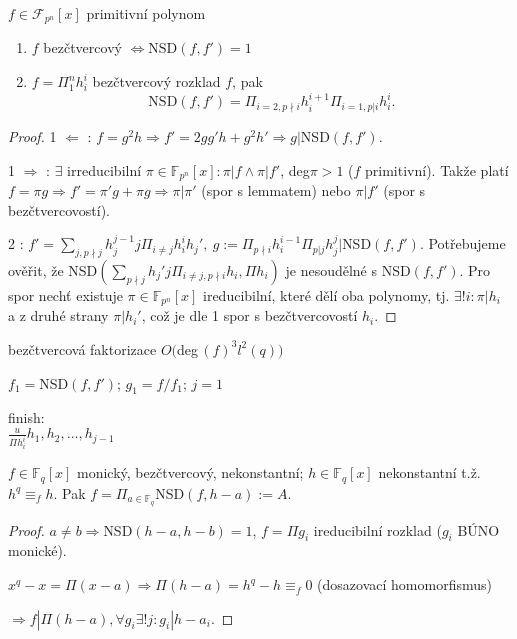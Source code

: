 \begin{thm}
    $f \in \mathcal{F}_{p^n}[x]$ primitivní polynom
    \begin{enumerate}
        \item $f$ bezčtvercový $\Leftrightarrow \text{NSD}(f,f')=1$
        \item $f=\Pi_1^nh_i^i$ bezčtvercový rozklad $f$, pak 
        \[
            \text{NSD}(f,f')=\Pi_{i=2,p\nmid i}h_i^{i+1}\Pi_{i=1,p|i}h_i^i.
        \]
    \end{enumerate}
    \begin{proof}
        1 $\Leftarrow$ : $f=g^2h\Rightarrow f'=2gg'h+g^2h'\Rightarrow g|$NSD$(f,f')$.

        1 $\Rightarrow$ : $\exists$ irreducibilní $\pi \in \mathbb{F}_{p^n}[x]:\pi|f \land \pi | f'$, deg$\pi>1$ ($f$ primitivní). Takže platí $f=\pi g \Rightarrow f'=\pi'g+\pi g \Rightarrow \pi | \pi'$ (spor s lemmatem) nebo $\pi | f'$ (spor s bezčtvercovostí).

        2 : $f'=\sum\limits_{j,p\nmid j}h_j^{j-1}j\Pi_{i\neq j}h_i^ih_j',\ g:=\Pi_{p\nmid i} h_i^{i-1}\Pi_{p|j}h_j^j|$NSD$(f,f')$. Potřebujeme ověřit, že NSD$(\sum\limits_{p\nmid j} h_j'j\Pi_{i\neq j,p\nmid i} h_i,\Pi h_i)$ je nesoudělné s NSD$(f,f')$. Pro spor nechť existuje $\pi \in \mathbb{F}_{p^n}[x]$ ireducibilní, které dělí oba polynomy, tj. $\exists!i:\pi|h_i$ a z druhé strany $\pi|h_i'$, což je dle 1 spor s bezčtvercovostí $h_i$.
    \end{proof}
\end{thm}

\begin{algorithm}
    \caption{bezčtvercová faktorizace $O($deg$\,(f)^3l^2(q))$}
    $f_1=$NSD$(f,f')$; $g_1=f/f_1$; $j=1$\;
    

    finish:\\
    \Return $\frac{u}{\Pi h_i^i}h_1,h_2,\dots,h_{j-1}$
    \vspace{0.2cm}
\end{algorithm}

\begin{claim}
    $f\in\mathbb{F}_q[x]$ monický, bezčtvercový, nekonstantní; $h\in\mathbb{F}_q[x]$ nekonstantní t.ž. $h^q\equiv_f h$. Pak $f=\Pi_{a\in\mathbb{F}_q}$NSD$(f,h-a):=A$.
    \begin{proof}
        $a \neq b \Rightarrow $NSD$(h-a,h-b)=1$, $f=\Pi g_i$ ireducibilní rozklad ($g_i$ BÚNO monické).

        $x^q-x=\Pi(x-a)\Rightarrow \Pi(h-a)= h^q-h\equiv_f0$ (dosazovací homomorfismus)
        
        $\Rightarrow f|\Pi(h-a), \forall g_i \exists!j:g_i|h-a_i$.
    \end{proof}
\end{claim}

